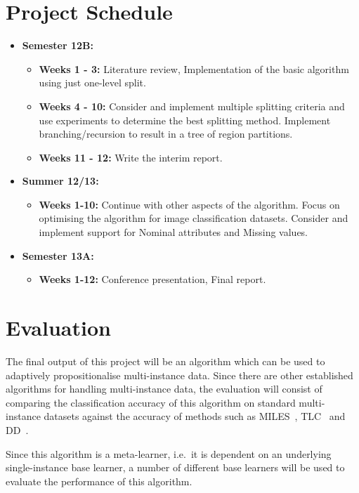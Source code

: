 \documentclass[a4paper,12pt]{article} %
\begin{document}
\section{Project Schedule}
\begin{itemize}

	\item {\bf Semester 12B:}
	\begin{itemize}
		\item {\bf Weeks 1 - 3:} Literature review, Implementation of the basic algorithm using just one-level split.
		\item {\bf Weeks 4 - 10:} 
			Consider and implement multiple splitting criteria and use experiments to determine the best splitting method.
			Implement branching/recursion to result in a tree of region partitions.
		\item {\bf Weeks 11 - 12:} Write the interim report.
	\end{itemize}

	\item {\bf Summer 12/13:}
	\begin{itemize}
		\item {\bf Weeks 1-10:} 
			Continue with other aspects of the algorithm. 
			Focus on optimising the algorithm for image classification datasets.
			Consider and implement support for Nominal attributes and Missing values.
	\end{itemize}
	
	\item {\bf Semester 13A:}
	\begin{itemize}
		\item {\bf Weeks 1-12:} Conference presentation, Final report.
	\end{itemize}
\end{itemize}

\section{Evaluation}

The final output of this project will be an algorithm which can be used to adaptively propositionalise multi-instance data. Since there are other established algorithms for handling multi-instance data, the evaluation will consist of comparing the classification accuracy of this algorithm on standard multi-instance datasets against the accuracy of methods such as MILES~\cite{Chen2006}, TLC~\cite{Weidmann2003} and DD~\cite{Maron98mil}.

Since this algorithm is a meta-learner, i.e.\ it is dependent on an underlying single-instance base learner, a number of different base learners will be used to evaluate the performance of this algorithm.
 
\end{document}
